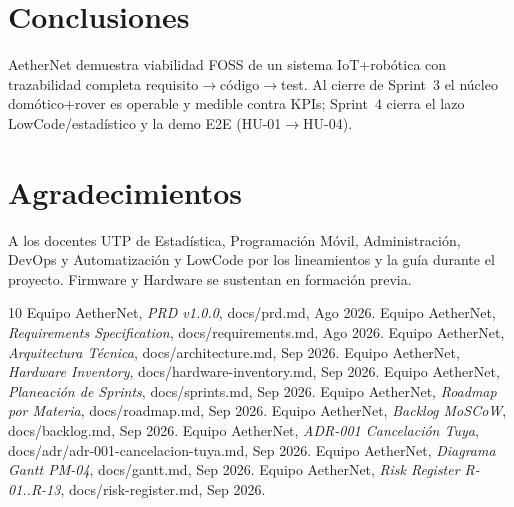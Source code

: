 \documentclass[conference]{IEEEtran}
\begin{document}
\section{Conclusiones}
AetherNet demuestra viabilidad FOSS de un sistema IoT+robótica con trazabilidad completa requisito$\rightarrow$código$\rightarrow$test. Al cierre de Sprint~3 el núcleo domótico+rover es operable y medible contra KPIs; Sprint~4 cierra el lazo LowCode/estadístico y la demo E2E (HU-01$\rightarrow$HU-04).

\section*{Agradecimientos}
A los docentes UTP de Estadística, Programación Móvil, Administración, DevOps y Automatización y LowCode por los lineamientos y la guía durante el proyecto. Firmware y Hardware se sustentan en formación previa.

\begin{thebibliography}{10}
 Equipo AetherNet, \emph{PRD v1.0.0}, docs/prd.md, Ago 2026.
 Equipo AetherNet, \emph{Requirements Specification}, docs/requirements.md, Ago 2026.
 Equipo AetherNet, \emph{Arquitectura Técnica}, docs/architecture.md, Sep 2026.
 Equipo AetherNet, \emph{Hardware Inventory}, docs/hardware-inventory.md, Sep 2026.
 Equipo AetherNet, \emph{Planeación de Sprints}, docs/sprints.md, Sep 2026.
 Equipo AetherNet, \emph{Roadmap por Materia}, docs/roadmap.md, Sep 2026.
 Equipo AetherNet, \emph{Backlog MoSCoW}, docs/backlog.md, Sep 2026.
 Equipo AetherNet, \emph{ADR-001 Cancelación Tuya}, docs/adr/adr-001-cancelacion-tuya.md, Sep 2026.
 Equipo AetherNet, \emph{Diagrama Gantt PM-04}, docs/gantt.md, Sep 2026.
 Equipo AetherNet, \emph{Risk Register R-01..R-13}, docs/risk-register.md, Sep 2026.
\end{thebibliography}
\end{document}
